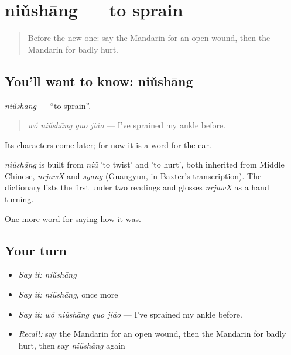 \section[niǔshāng]{niǔshāng — to sprain}

\label{lesson:ZH-C478-niushang}



\begin{quote}
Before the new one: say the Mandarin for an open wound, then the Mandarin for badly hurt.
\end{quote}

\subsection*{You'll want to know: niǔshāng}
\emph{niǔshāng} — \textquotedblleft{}to sprain\textquotedblright{}.

\begin{quote}
\emph{wǒ niǔshāng guo jiǎo} — I've sprained my ankle before.
\end{quote}

Its characters come later; for now it is a word for the ear.

\begin{cousinweb}
\emph{niǔshāng} is built from \emph{niǔ} 'to twist' and  'to hurt', both inherited from Middle Chinese, \emph{nrjuwX} and \emph{syang} (Guangyun, in Baxter's transcription). The dictionary lists the first under two readings and glosses \emph{nrjuwX} as a hand turning.
\end{cousinweb}

\begin{grammarlens}[title={What you've built}]
One more word for saying how it was.
\end{grammarlens}

\subsection*{Your turn}
\begin{itemize}
\raggedright
  \item \emph{Say it:} \emph{niǔshāng}
  \item \emph{Say it:} \emph{niǔshāng}, once more
  \item \emph{Say it:} \emph{wǒ niǔshāng guo jiǎo} — I've sprained my ankle before.
  \item \emph{Recall:} say the Mandarin for an open wound, then the Mandarin for badly hurt, then say \emph{niǔshāng} again
\end{itemize}

